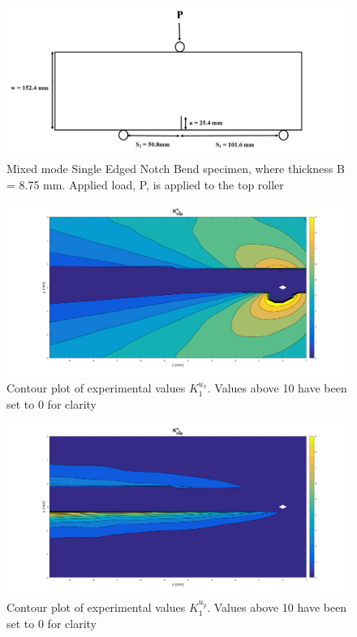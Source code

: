 \documentclass[12pt]{article}
\begin{document}
\begin{figure}[H]
	\centering
	\includegraphics[width=1\textwidth]{Geometry_Mixed.png}
	\caption{Mixed mode Single Edged Notch Bend specimen, where thickness B = 8.75 mm. Applied load, P, is applied to the top roller}
	\label{fig:Geometry_Mixed}
\end{figure}


\begin{figure}[H]
	\centering
	\includegraphics[width=1\textwidth]{K_U_T_2.png}
	\caption{Contour plot of experimental values $K_1^{u_x}$.  Values above 10 have been set to 0 for clarity}
	\label{fig:kU}
\end{figure}

\begin{figure}[H]
	\centering
	\includegraphics[width=1\textwidth]{K_V_T_2.png}
	\caption{Contour plot of experimental values $K_1^{u_y}$. Values above 10 have been set to 0 for clarity}
	\label{fig:kV}
\end{figure}
\end{document}
